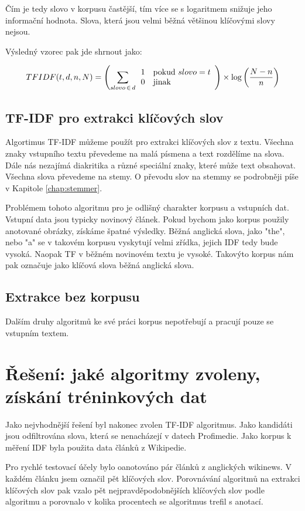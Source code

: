 Čím je tedy slovo v korpusu častější, tím více se s logaritmem snižuje jeho informační hodnota. Slova, která jsou velmi běžná většinou klíčovými slovy nejsou.

Výsledný vzorec pak jde shrnout jako:

\begin{equation}
TFIDF(t,d,n,N)= \left(\sum_{slovo\,\in\,d} \begin{array}{l l} 1 & \mathrm{pokud}\ slovo = t \\
  0 & \mathrm{jinak} \end{array}\right)
  \times
  \log \left(\frac{N - n}{n}\right)
\end{equation}

\subsection{TF-IDF pro extrakci klíčových slov}

Algortimus TF-IDF můžeme použít pro extrakci klíčových slov z textu. Všechna znaky vstupního textu převedeme na malá písmena a text rozdělíme na slova. Dále nás nezajímá diakritika a různé speciální znaky, které může text obsahovat. Všechna slova převedeme na stemy. O převodu slov na stemmy se podrobněji píše v Kapitole \ref{chap:stemmer}.



Problémem tohoto algoritmu pro je odlišný charakter korpusu a vstupních dat. Vstupní data jsou typicky novinový článek. Pokud bychom jako korpus použily anotované obrázky, získáme špatné výsledky. Běžná anglická slova, jako "the", nebo "a" se v takovém korpusu vyskytují velmi zřídka, jejich IDF tedy bude vysoká. Naopak TF v běžném novinovém textu je vysoké. Takovýto korpus nám pak označuje jako klíčová slova běžná anglická slova.


\subsection{Extrakce bez korpusu}

Dalším druhy algoritmů ke své práci korpus nepotřebují a pracují pouze se vstupním textem.

\section{Řešení: jaké algoritmy zvoleny, získání tréninkových dat}

Jako nejvhodnější řešení byl nakonec zvolen TF-IDF algoritmus. Jako kandidáti jsou odfiltrována slova, která se nenacházejí v datech Profimedie. Jako korpus k měření IDF byla použita data článků z Wikipedie.

Pro rychlé testovací účely bylo oanotováno pár článků z anglických wikinews. V každém článku jsem označil pět klíčových slov. Porovnávání algoritmů na extrakci klíčových slov pak vzalo pět nejpravděpodobnějších klíčových slov podle algoritmu a porovnalo v kolika procentech se algoritmus trefil s anotací.



